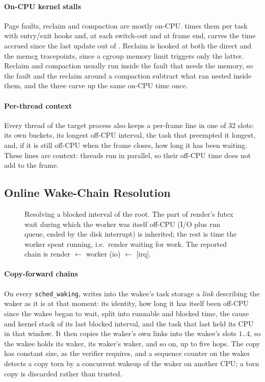 \paragraph{On-CPU kernel stalls} Page faults, reclaim and compaction are mostly
on-CPU. \sys times them per task with entry/exit hooks and, at each
switch-out and at frame end, carves the time accrued since the last update
out of . Reclaim is hooked at both the direct and the memcg
tracepoints, since a cgroup memory limit triggers only the latter. Reclaim
and compaction usually run inside the fault that needs the memory, so the
fault and the reclaim around a compaction subtract what ran nested inside
them, and the three carve up the same on-CPU time once.

\paragraph{Per-thread context} Every thread of the target process also keeps a
per-frame line in one of 32 slots: its own buckets, its longest off-CPU
interval, the task that preempted it longest, and, if it is still off-CPU
when the frame closes, how long it has been waiting. These lines are context:
threads run in parallel, so their off-CPU time does not add to the frame.

\subsection{Online Wake-Chain Resolution}
\label{sec:chain}

\begin{figure}[t]
\centering

\caption{Resolving a blocked interval of the root. The part of render's
futex wait during which the worker was itself off-CPU (I/O plus run queue,
ended by the disk interrupt) is inherited; the rest is time the worker spent
running, i.e.\ render waiting for work. The reported chain is
render $\leftarrow$ worker (io) $\leftarrow$ [irq].}
\label{fig:chain}
\end{figure}

\paragraph{Copy-forward chains} On every \texttt{sched\_waking}, \sys writes into
the wakee's task storage a \emph{link} describing the waker as it is at that
moment: its identity, how long it has itself been off-CPU since the wakee
began to wait, split into runnable and blocked time, the cause and kernel
stack of its last blocked interval, and the task that last held its CPU in
that window. It then copies the waker's own links into the wakee's
slots $1..4$, so the wakee holds its waker, its waker's waker, and so on, up
to five hops. The copy has constant size, as the verifier requires, and a
sequence counter on the waker detects a copy torn by a concurrent wakeup of
the waker on another CPU; a torn copy is discarded rather than trusted.

